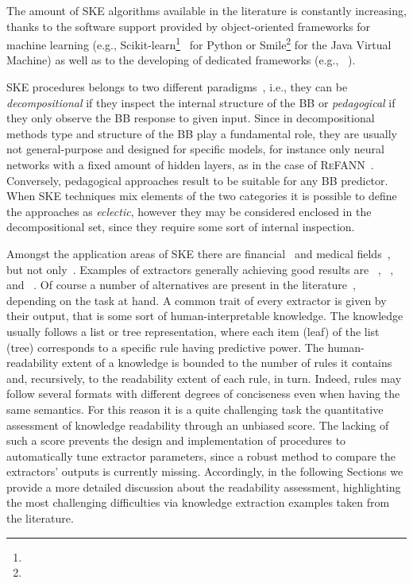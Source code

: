 \documentclass[sigconf]{acmart}
\begin{document}
The amount of SKE algorithms available in the literature is constantly increasing, thanks to the software support provided by object-oriented frameworks for machine learning (e.g., Scikit-learn\footnote{}~\cite{PedregosaVGMTGBPWDVPCBPD11} for Python or Smile\footnote{} for the Java Virtual Machine) as well as to the developing of dedicated frameworks (e.g., \psyke{}~\cite{psyke-woa2021,psyke-ia2022,psyke-extraamas2022}).

SKE procedures belongs to two different paradigms~\cite{andrews1995survey}, i.e., they can be \emph{decompositional} if they inspect the internal structure of the BB or \emph{pedagogical} if they only observe the BB response to given input.
%
Since in decompositional methods type and structure of the BB play a fundamental role, they are usually not general-purpose and designed for specific models, for instance only neural networks with a fixed amount of hidden layers, as in the case of \textsc{ReFANN}~\cite{setiono2002extraction}.
%
Conversely, pedagogical approaches result to be suitable for any BB predictor.
%
When SKE techniques mix elements of the two categories it is possible to define the approaches as \emph{eclectic}, however they may be considered enclosed in the decompositional set, since they require some sort of internal inspection.

Amongst the application areas of SKE there are financial~\cite{baesens2001building,baesens2003using,steiner2006using} and medical fields~\cite{bologna1997three,franco2007early,hayashi2000comparison}, but not only~\cite{setiono2011rule,sabbatini22LPFSKE,azcarraga2012keyword,hofmann2003rule}.
%
Examples of extractors generally achieving good results are \cart{}~\cite{breiman1984classification}, \trepan{}~\cite{craven1996extracting}, \gridex{}~\cite{gridex-extraamas2021} and \gridrex{}~\cite{gridrex-kr2022}.
%
Of course a number of alternatives are present in the literature~\cite{craven1994using,huysmans2006iter,barakat2005eclectic,martens2007comprehensible}, depending on the task at hand.
%
A common trait of every extractor is given by their output, that is some sort of human-interpretable knowledge.
%
The knowledge usually follows a list or tree representation, where each item (leaf) of the list (tree) corresponds to a specific rule having predictive power.
%
The human-readability extent of a knowledge is bounded to the number of rules it contains and, recursively, to the readability extent of each rule, in turn.
%
Indeed, rules may follow several formats with different degrees of conciseness even when having the same semantics.
%
For this reason it is a quite challenging task the quantitative assessment of knowledge readability through an unbiased score.
%
The lacking of such a score prevents the design and implementation of procedures to automatically tune extractor parameters, since a robust method to compare the extractors' outputs is currently missing.
%
Accordingly, in the following Sections we provide a more detailed discussion about the readability assessment, highlighting the most challenging difficulties via knowledge extraction examples taken from the literature.
\end{document}
